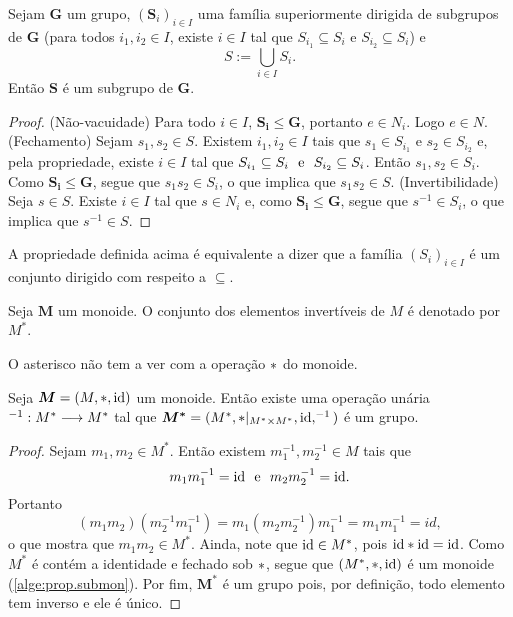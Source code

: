 \begin{prop}
\label{alge:prop.subgru.uni}
Sejam $\bm G$ um grupo, $(\bm S_i)_{i \in I}$ uma família superiormente dirigida de subgrupos de $\bm G$ (para todos $i_1,i_2 \in I$, existe $i \in I$ tal que $S_{i_1} \subseteq S_i$ e $S_{i_2} \subseteq S_i$) e
	\begin{equation*}
	S := \bigcup_{i \in I} S_i.
	\end{equation*}
Então $\bm S$ é um subgrupo de $\bm G$.
\end{prop}
\begin{proof}
(Não-vacuidade) Para todo $i \in I$, $\bm{S_i}\leq \bm G$, portanto $e \in N_i$. Logo $e \in N$. (Fechamento) Sejam $s_1,s_2 \in S$. Existem $i_1,i_2 \in I$ tais que $s_1 \in S_{i_1}$ e $s_2 \in S_{i_2}$ e, pela propriedade, existe $i \in I$ tal que $S_{i_1} \subseteq S_{i} \text{\ \ e\ \ } S_{i_2} \subseteq S_{i}$. Então $s_1,s_2 \in S_i$. Como $\bm{S_i} \leq \bm G$, segue que $s_1s_2 \in S_i$, o que implica que $s_1s_2 \in S$. (Invertibilidade) Seja $s \in S$. Existe $i \in I$ tal que $s \in N_i$ e, como $\bm{S_i} \leq \bm G$, segue que $s^{-1} \in S_i$, o que implica que $s^{-1} \in S$.
\end{proof}

A propriedade definida acima é equivalente a dizer que a família $(S_i)_{i \in I}$ é um conjunto dirigido com respeito a $\subseteq$.

\begin{defi}
	Seja $\bm M$ um monoide. O conjunto dos elementos invertíveis de $M$ é denotado por $M^*$.
\end{defi}

O asterisco não tem a ver com a operação $\ast$ do monoide.

\begin{prop}
Seja $\bm M = (M,\ast,\mathrm{id})$ um monoide. Então existe uma operação unária $^{-1}: M^* \longrightarrow M^*$ tal que $\bm{M^*}=(M^*,\ast|_{M^* \times M^*},\mathrm{id},^{-1})$ é um grupo.
\end{prop}
\begin{proof}
	Sejam $m_1,m_2 \in M^*$. Então existem $m_1^{-1},m_2^{-1} \in M$ tais que
	\begin{equation*}
	m_1m_1^{-1}=\mathrm{id} \text{\ \ e\ \ } m_2m_2^{-1}=\mathrm{id}.
	\end{equation*}
Portanto
	\begin{equation*}
	(m_1m_2)(m_2^{-1}m_1^{-1}) = m_1(m_2m_2^{-1})m_1^{-1} = m_1m_1^{-1} = id,
	\end{equation*}
o que mostra que $m_1m_2 \in M^*$. Ainda, note que $\mathrm{id} \in M^*$, pois $\mathrm{id} \ast \mathrm{id} = \mathrm{id}$. Como $M^*$ é contém a identidade e fechado sob $\ast$, segue que $(M^*,\ast,\mathrm{id})$ é um monoide (\ref{alge:prop.submon}). Por fim, $\bm{M^*}$ é um grupo pois, por definição, todo elemento tem inverso e ele é único.
\end{proof}

